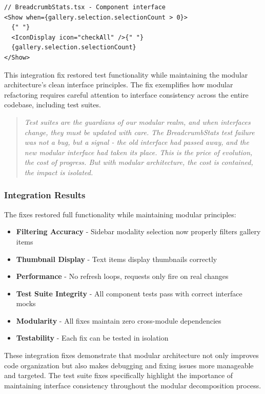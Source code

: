 \documentclass[11pt]{article}
\begin{document}
\begin{lstlisting}[style=typescript]
// BreadcrumbStats.tsx - Component interface
<Show when={gallery.selection.selectionCount > 0}>
  {" "}
  <IconDisplay icon="checkAll" />{" "}
  {gallery.selection.selectionCount}
</Show>
\end{lstlisting}

This integration fix restored test functionality while maintaining the modular architecture's clean interface principles. The fix exemplifies how modular refactoring requires careful attention to interface consistency across the entire codebase, including test suites.

\begin{quote}
\emph{Test suites are the guardians of our modular realm, and when interfaces change, they must be updated with care. The BreadcrumbStats test failure was not a bug, but a signal - the old interface had passed away, and the new modular interface had taken its place. This is the price of evolution, the cost of progress. But with modular architecture, the cost is contained, the impact is isolated.}
\end{quote}

\subsubsection{Integration Results}

The fixes restored full functionality while maintaining modular principles:

\begin{itemize}
\item \textbf{Filtering Accuracy} - Sidebar modality selection now properly filters gallery items
\item \textbf{Thumbnail Display} - Text items display thumbnails correctly
\item \textbf{Performance} - No refresh loops, requests only fire on real changes
\item \textbf{Test Suite Integrity} - All component tests pass with correct interface mocks
\item \textbf{Modularity} - All fixes maintain zero cross-module dependencies
\item \textbf{Testability} - Each fix can be tested in isolation
\end{itemize}

These integration fixes demonstrate that modular architecture not only improves code organization but also makes debugging and fixing issues more manageable and targeted. The test suite fixes specifically highlight the importance of maintaining interface consistency throughout the modular decomposition process.
\end{document}
